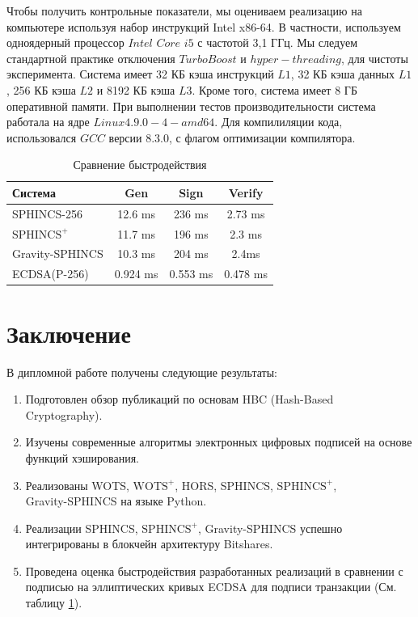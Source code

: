 \documentclass[a4paper, 14pt]{extarticle}
\begin{document}
Чтобы получить контрольные показатели, мы оцениваем реализацию на компьютере используя набор инструкций Intel x86-64. В частности, используем одноядерный процессор $Intel$ $Core$ $i5$ с частотой 3,1 ГГц. Мы следуем стандартной практике отключения $TurboBoost$ и $hyper-threading$, для чистоты эксперимента. Система имеет 32 КБ кэша инструкций $L1$, 32 КБ кэша данных $L1$, 256 КБ кэша $L2$ и 8192 КБ кэша $L3$. Кроме того, система имеет 8 ГБ оперативной памяти. При выполнении тестов производительности система работала на ядре $Linux 4.9.0-4-amd64$. Для компилиляции кода, использовался $GCC$ версии 8.3.0, с флагом оптимизации компилятора.
\newline

\begin{table}[h!]
    \begin{center}
      \caption{Сравнение быстродействия}
      \label{tab:table1}
      \begin{tabular}{l|c|c|c}
        \textbf{Система} & \textbf{Gen} & \textbf{Sign} & \textbf{Verify}\\
        \hline
        SPHINCS-256 & 12.6 ms & 236 ms & 2.73 ms\\
        $\text{SPHINCS}^+$ & 11.7 ms & 196 ms & 2.3 ms\\
        Gravity-SPHINCS & 10.3 ms & 204 ms & 2.4ms\\
        ECDSA(P-256) & 0.924 ms & 0.553 ms & 0.478 ms\\
      \end{tabular}
    \end{center}
  \end{table}
\newpage

\section{Заключение}
В дипломной работе получены следующие результаты:
\begin{enumerate}
    \item Подготовлен обзор публикаций по основам HBC (Hash-Based\\ Cryptography).
    \item Изучены современные алгоритмы электронных цифровых подписей на основе функций хэширования.
    \item Реализованы WOTS, $\text{WOTS}^+$, HORS, SPHINCS, $\text{SPHINCS}^+$, \\Gravity-SPHINCS на языке Python.
    \item Реализации SPHINCS, $\text{SPHINCS}^+$, Gravity-SPHINCS успешно интегрированы в блокчейн архитектуру Bitshares.
    \item Проведена оценка быстродействия разработанных реализаций в сравнении с подписью на эллиптических кривых ECDSA для подписи транзакции (См. таблицу \ref{tab:table1}).
\end{enumerate}
\end{document}
